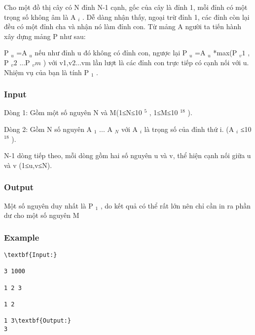 



   Cho một đồ thị cây có N đỉnh N-1 cạnh, gốc của cây là đỉnh 1, mỗi đỉnh có một trọng số không âm là A   $_    i   $   . Dễ dàng nhận thấy, ngoại trừ đỉnh 1, các đỉnh còn lại đều có một đỉnh cha và nhận nó làm đỉnh con. Từ mảng A người ta tiến hành xây dựng mảng P như sau:  

   P   $_    u   $   =A   $_    u   $   nếu như đỉnh u đó không có đỉnh con, ngược lại P   $_    u   $   =A   $_    u   $   *max(P   $_    v1   $   , P   $_    v2   $   ...P   $_    vm   $   ) với v1,v2...vm lần lượt là các đỉnh con trực tiếp có cạnh nối với u. Nhiệm vụ của bạn là tính P   $_    1   $   .  

\subsubsection{   Input  }

   Dòng 1: Gồm một số nguyên N và M(1≤N≤10   $^    5   $   , 1≤M≤10   $^    18   $   ).  

   Dòng 2: Gồm N số nguyên A   $_    1   $   ... A   $_    N   $   với A   $_    i   $   là trọng số của đỉnh thứ i. (A   $_    i   $   ≤10   $^    18   $   ).  

   N-1 dòng tiếp theo, mỗi dòng gồm hai số nguyên u và v, thể hiện cạnh nối giữa u và v (1≤u,v≤N).  

\subsubsection{   Output  }

   Một số nguyên duy nhất là P   $_    1   $   , do kết quả có thể rất lớn nên chỉ cần in ra phần dư cho một số nguyên M  

\subsubsection{   Example  }
\begin{verbatim}
\textbf{Input:}

3 1000

1 2 3

1 2

1 3\textbf{Output:}
3\end{verbatim}